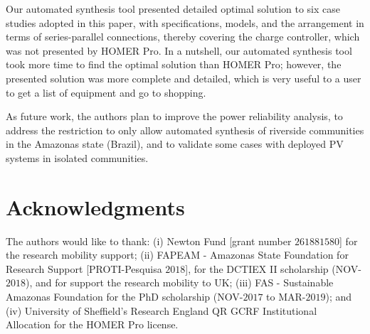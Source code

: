 \documentclass[review]{elsarticle}
\begin{document}
Our automated synthesis tool presented detailed optimal solution 
to six case studies adopted in this paper, with specifications, 
models, and the arrangement in terms of series-parallel connections, 
thereby covering the charge controller, which was not presented by HOMER Pro. 
In a nutshell, our automated synthesis tool took more time 
to find the optimal solution than HOMER Pro; however, the presented 
solution was more complete and detailed, which is very useful 
to a user to get a list of equipment and go to shopping.

As future work, the authors plan to improve the power reliability analysis, 
to address the restriction to only allow automated synthesis of 
riverside communities in the Amazonas state (Brazil), and to 
validate some cases with deployed PV systems in isolated communities.

\section*{Acknowledgments}
The authors would like to thank: (i) Newton Fund [grant number $261881580$] for the research mobility support; (ii) FAPEAM - Amazonas State Foundation for Research Support [PROTI-Pesquisa $2018$], for the DCTIEX II scholarship (NOV-$2018$), and for support the research mobility to UK; (iii) FAS - Sustainable Amazonas Foundation for the PhD scholarship (NOV-$2017$ to MAR-$2019$); and (iv) University of Sheffield's Research England QR GCRF Institutional Allocation for the HOMER Pro license.

%
{}
\end{document}
